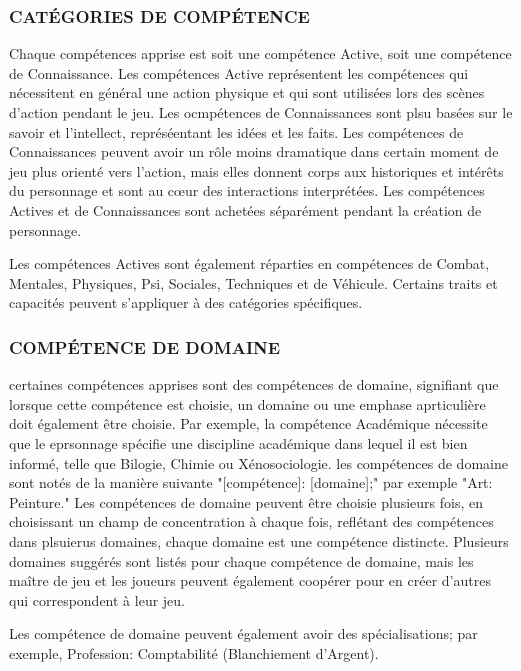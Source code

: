 \subsubsection{CATÉGORIES DE COMPÉTENCE} Chaque compétences apprise est soit une compétence Active, soit une compétence de Connaissance. Les compétences Active représentent les compétences qui nécessitent en général une action physique et qui sont utilisées lors des scènes d'action pendant le jeu. Les ocmpétences de Connaissances sont plsu basées sur le savoir et l'intellect, représéentant les idées et les faits. Les compétences de Connaissances peuvent avoir un rôle moins dramatique dans certain moment de jeu plus orienté vers l'action, mais elles donnent corps aux historiques et intérêts du personnage et sont au cœur des interactions interprétées. Les compétences Actives et de Connaissances sont achetées séparément pendant la création de personnage. 

Les compétences Actives sont également réparties en compétences de Combat, Mentales, Physiques, Psi, Sociales, Techniques et de Véhicule. Certains traits et capacités peuvent s'appliquer à des catégories spécifiques. 



\subsubsection{COMPÉTENCE DE DOMAINE} certaines compétences apprises sont des compétences de domaine, signifiant que lorsque cette compétence est choisie, un domaine ou une emphase aprticulière doit également être choisie. Par exemple, la compétence Académique nécessite que le eprsonnage spécifie une discipline académique dans lequel il est bien informé, telle que Bilogie, Chimie ou Xénosociologie. les compétences de domaine sont notés de la manière suivante "[compétence]: [domaine];" par exemple "Art: Peinture." Les compétences de domaine peuvent être choisie plusieurs fois, en choisissant un champ de concentration à chaque fois, reflétant des compétences dans plsuierus domaines, chaque domaine est une compétence distincte. Plusieurs domaines suggérés sont listés pour chaque compétence de domaine, mais les maître de jeu et les joueurs peuvent également coopérer pour en créer d'autres qui correspondent à leur jeu. 

Les compétence de domaine peuvent également avoir des spécialisations; par exemple, Profession: Comptabilité (Blanchiement d'Argent). 



